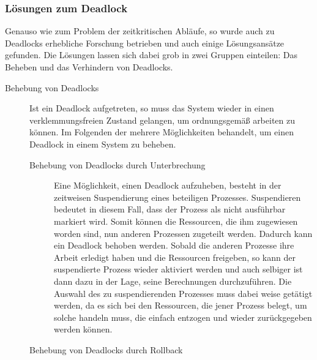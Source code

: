 			\subsubsection{Lösungen zum Deadlock}
			
				Genauso wie zum Problem der zeitkritischen Abläufe, so wurde auch zu Deadlocks erhebliche Forschung betrieben und auch einige Lösungsansätze gefunden. Die Lösungen lassen sich dabei grob in zwei Gruppen einteilen: Das Beheben und das Verhindern von Deadlocks.  \cite{ModerneBetriebssysteme}
			
				\begin{description}
					\item[Behebung von Deadlocks]
						\label{BehebungDeadlocks}
						
						Ist ein Deadlock aufgetreten, so muss das System wieder in einen verklemmungsfreien Zustand gelangen, um ordnungsgemäß arbeiten zu können. Im Folgenden der mehrere Möglichkeiten behandelt, um einen Deadlock in einem System zu beheben.
						
						\begin{description}
							\item[Behebung von Deadlocks durch Unterbrechung]
							
								Eine Möglichkeit, einen Deadlock aufzuheben, besteht in der zeitweisen Suspendierung eines beteiligen Prozesses. Suspendieren bedeutet in diesem Fall, dass der Prozess als nicht ausführbar markiert wird. Somit können die Ressourcen, die ihm zugewiesen worden sind, nun anderen Prozessen zugeteilt werden. Dadurch kann ein Deadlock behoben werden. Sobald die anderen Prozesse ihre Arbeit erledigt haben und die Ressourcen freigeben, so kann der suspendierte Prozess wieder aktiviert werden und auch selbiger ist dann dazu in der Lage, seine Berechnungen durchzuführen. Die Auswahl des zu suspendierenden Prozesses muss dabei weise getätigt werden, da es sich bei den Ressourcen, die jener Prozess belegt, um solche handeln muss, die einfach entzogen und wieder zurückgegeben werden können.
								
							\item[Behebung von Deadlocks durch Rollback]
							

\end{description}
\end{description}

